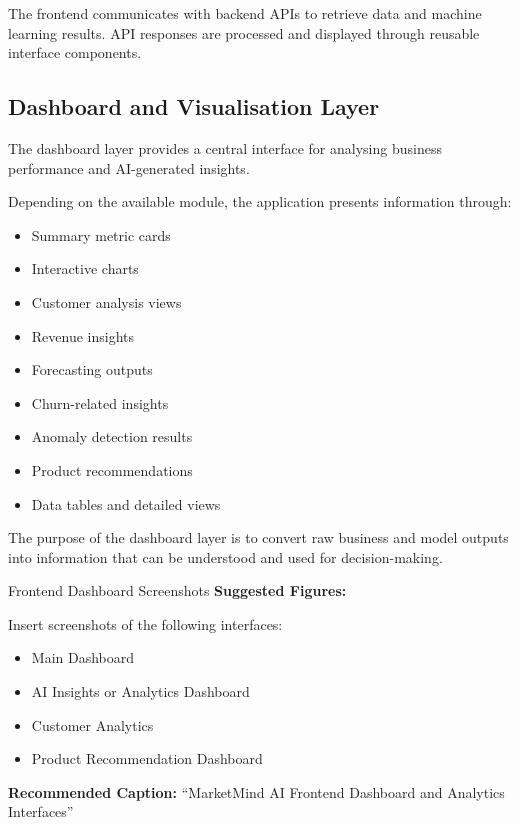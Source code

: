 \documentclass[12pt,a4paper]{report}
\begin{document}
The frontend communicates with backend APIs to retrieve data and
machine learning results. API responses are processed and displayed
through reusable interface components.

\subsection{Dashboard and Visualisation Layer}

The dashboard layer provides a central interface for analysing business
performance and AI-generated insights.

Depending on the available module, the application presents information
through:

\begin{itemize}[leftmargin=1.2cm]
    \item Summary metric cards
    \item Interactive charts
    \item Customer analysis views
    \item Revenue insights
    \item Forecasting outputs
    \item Churn-related insights
    \item Anomaly detection results
    \item Product recommendations
    \item Data tables and detailed views
\end{itemize}

The purpose of the dashboard layer is to convert raw business and model
outputs into information that can be understood and used for
decision-making.

\begin{screenshotplaceholder}{Frontend Dashboard Screenshots}
\textbf{Suggested Figures:}

\vspace{0.2cm}

Insert screenshots of the following interfaces:

\begin{itemize}
    \item Main Dashboard
    \item AI Insights or Analytics Dashboard
    \item Customer Analytics
    \item Product Recommendation Dashboard
\end{itemize}

\vspace{0.2cm}

\textbf{Recommended Caption:}
``MarketMind AI Frontend Dashboard and Analytics Interfaces''
\end{screenshotplaceholder}
\end{document}
